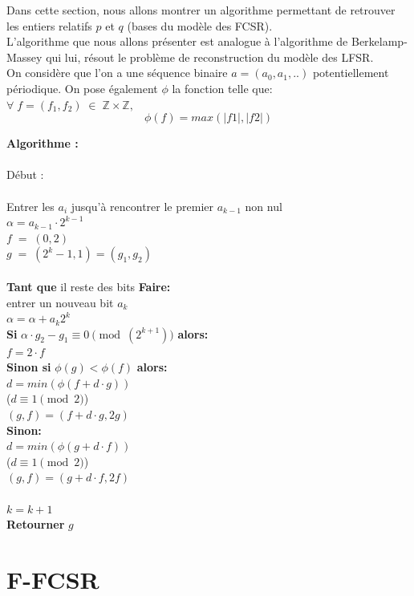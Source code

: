 \documentclass[11pt]{report}
\begin{document}
	Dans cette section, nous allons montrer un algorithme permettant de retrouver les entiers relatifs $p$ et $q$ (bases du modèle des FCSR). 
	 \\
	 L'algorithme que nous allons présenter est analogue à l'algorithme de Berkelamp-Massey qui lui, résout le problème de reconstruction du modèle des LFSR. \\
	 On considère que l'on a une séquence binaire $a = (a_0,a_1,..)$ potentiellement périodique. On pose également $\phi$ la fonction telle que:\\
	 $\forall \; f=(f_1,f_2) \; \in \; \mathbb{Z} \times \mathbb{Z},$\\
	 $$\phi(f)=max(|f1|,|f2|)$$
	 
	 \textbf{Algorithme :} \\\\
	 Début : \\\\
	 Entrer les $a_i$ jusqu'à rencontrer le premier $a_{k-1}$ non nul\\
	 $\alpha = a_{k-1} \cdot 2^{k-1}$\\
	 $f \; = \; (0,2)$\\
	 $g \; = \; (2^k-1,1)=(g_1,g_2)$\\\\
	 \textbf{Tant que} il reste des bits \textbf{Faire:}\\
 entrer un nouveau bit $a_k$ \\ 
 $\alpha = \alpha + a_k2^k$\\
 \textbf{Si} $\alpha \cdot g_2 - g_1 \equiv 0 \pmod(2^{k+1})$ \textbf{alors:}\\ 
 $f = 2 \cdot f$\\
 \textbf{Sinon si} $\phi(g) < \phi(f)$ \textbf{alors:}\\
 $d = min(\phi(f+d \cdot g))$\\
 ($d \equiv 1 \pmod 2$)	 \\
 $(g,f)=(f+d \cdot g, 2g)$\\
 \textbf{Sinon:}\\
 $d = min(\phi(g+d \cdot f))$\\
 ($d \equiv 1 \pmod 2$)	 \\
  $(g,f)=(g+d \cdot f, 2f)$\\\\
  $k=k+1$\\
  \textbf{Retourner} $g$\\
 
\section{F-FCSR}
\end{document}
